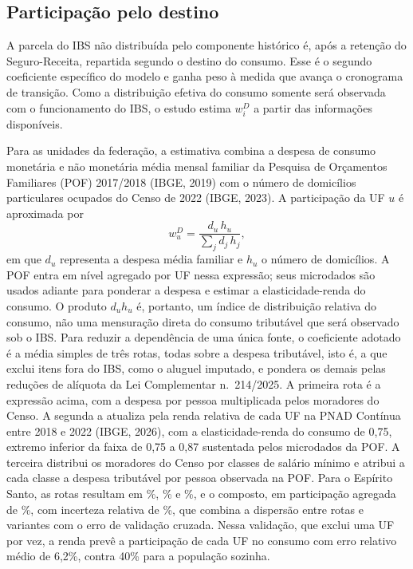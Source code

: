 \documentclass[12pt,a4paper]{article}
\newcommand{\nn}{n.\textordmasculine}
\begin{document}
\subsection{Participação pelo destino}

A parcela do IBS não distribuída pelo componente histórico é, após a retenção do Seguro-Receita, repartida segundo o destino do consumo. Esse é o segundo coeficiente específico do modelo e ganha peso à medida que avança o cronograma de transição. Como a distribuição efetiva do consumo somente será observada com o funcionamento do IBS, o estudo estima $w^{D}_{i}$ a partir das informações disponíveis.

Para as unidades da federação, a estimativa combina a despesa de consumo monetária e não monetária média mensal familiar da Pesquisa de Orçamentos Familiares (POF) 2017/2018 (IBGE, 2019) com o número de domicílios particulares ocupados do Censo de 2022 (IBGE, 2023). A participação da UF $u$ é aproximada por
\begin{equation}\label{eq:wd}
  w^{D}_{u}=\frac{d_{u}\,h_{u}}{\displaystyle\sum_{j}d_{j}\,h_{j}},
\end{equation}
em que $d_{u}$ representa a despesa média familiar e $h_{u}$ o número de domicílios. A POF entra em nível agregado por UF nessa expressão; seus microdados são usados adiante para ponderar a despesa e estimar a elasticidade-renda do consumo. O produto $d_{u}h_{u}$ é, portanto, um índice de distribuição relativa do consumo, não uma mensuração direta do consumo tributável que será observado sob o IBS. Para reduzir a dependência de uma única fonte, o coeficiente adotado é a média simples de três rotas, todas sobre a despesa tributável, isto é, a que exclui itens fora do IBS, como o aluguel imputado, e pondera os demais pelas reduções de alíquota da Lei Complementar \nn~214/2025. A primeira rota é a expressão acima, com a despesa por pessoa multiplicada pelos moradores do Censo. A segunda a atualiza pela renda relativa de cada UF na PNAD Contínua entre 2018 e 2022 (IBGE, 2026), com a elasticidade-renda do consumo de 0,75, extremo inferior da faixa de 0,75 a 0,87 sustentada pelos microdados da POF. A terceira distribui os moradores do Censo por classes de salário mínimo e atribui a cada classe a despesa tributável por pessoa observada na POF. Para o Espírito Santo, as rotas resultam em \NumRotaA\%, \NumRotaB\% e \NumRotaC\%, e o composto, em participação agregada de \NumComposto\%, com incerteza relativa de \NumIncert\%, que combina a dispersão entre rotas e variantes com o erro de validação cruzada. Nessa validação, que exclui uma UF por vez, a renda prevê a participação de cada UF no consumo com erro relativo médio de 6,2\%, contra 40\% para a população sozinha.
\end{document}
